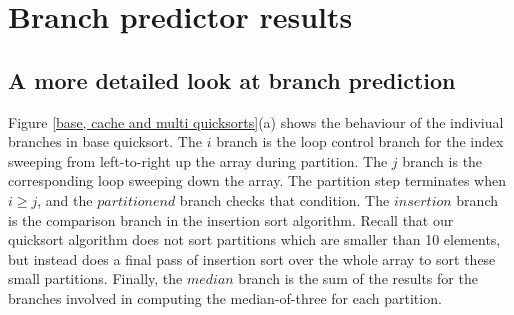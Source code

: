 \section{Branch predictor results}

\subsection{A more detailed look at branch prediction}





Figure \ref{base, cache and multi quicksorts}(a) shows the behaviour
of the indiviual branches in base quicksort. The $i$ branch is the
loop control branch for the index sweeping from left-to-right up the
array during partition. The $j$ branch is the corresponding loop
sweeping down the array. The partition step terminates when $i \geq
j$, and the $partition end$ branch checks that condition. The
$insertion$ branch is the comparison branch in the insertion sort
algorithm. Recall that our quicksort algorithm does not sort
partitions which are smaller than 10 elements, but instead does a
final pass of insertion sort over the whole array to sort these small
partitions. Finally, the $median$ branch is the sum of the results for
the branches involved in computing the median-of-three for each
partition.

